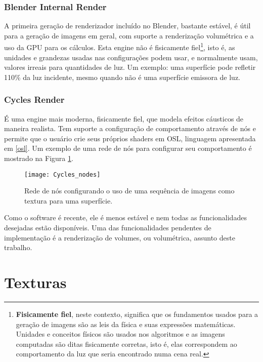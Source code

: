 \subsubsection{Blender Internal Render}

A primeira geração de renderizador incluído no Blender, bastante estável, é útil para a geração de imagens em geral, com suporte a renderização volumétrica e a uso da GPU para os cálculos. Esta engine não é fisicamente fiel\footnote{{\bf Fisicamente fiel}, neste contexto, significa que os fundamentos usados para a geração de imagens são as leis da física e suas expressões matemáticas. Unidades e conceitos físicos são usados nos algoritmos e as imagens computadas são ditas fisicamente corretas, isto é, elas correspondem ao comportamento da luz que seria encontrado numa cena real.}, isto é, as unidades e grandezas usadas nas configurações podem usar, e normalmente usam, valores irreais para quantidades de luz. Um exemplo: uma superfície pode refletir 110\% da luz incidente, mesmo quando não é uma superfície emissora de luz.

\subsubsection{Cycles Render}

É uma engine mais moderna, fisicamente fiel, que modela efeitos cáusticos de maneira realista. Tem suporte a configuração de comportamento através de nós e permite que o usuário crie seus próprios shaders em OSL, linguagem apresentada em \ref{osl}. Um exemplo de uma rede de nós para configurar seu comportamento é mostrado na Figura \ref{nodes}. \\

\begin{figure}[!htb]
\center
\texttt{[image: Cycles\_nodes]}
\caption{Rede de nós configurando o uso de uma sequência de imagens como textura para uma superfície.}
\label{nodes}
\end{figure}

Como o software é recente, ele é menos estável e nem todas as funcionalidades desejadas estão disponíveis. Uma das funcionalidades pendentes de implementação é a renderização de volumes, ou volumétrica, assunto deste trabalho.

\section{Texturas}
\label{tex_def}

